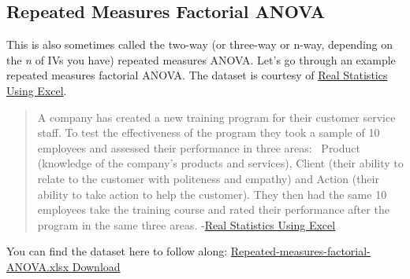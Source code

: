 \documentclass[
]{book}
\begin{document}
\hypertarget{repeated-measures-factorial-anova}{%
\subsection{Repeated Measures Factorial ANOVA}\label{repeated-measures-factorial-anova}}

This is also sometimes called the two-way (or three-way or n-way, depending on the \emph{n} of IVs you have) repeated measures ANOVA. Let's go through an example repeated measures factorial ANOVA. The dataset is courtesy of \href{https://www.real-statistics.com/anova-repeated-measures/two-within-subjects-factors/}{Real Statistics Using Excel}.

\begin{quote}
A company has created a new training program for their customer service staff. To test the effectiveness of the program they took a sample of 10 employees and assessed their performance in three areas: ~Product (knowledge of the company's products and services), Client (their ability to relate to the customer with politeness and empathy) and Action (their ability to take action to help the customer). They then had the same 10 employees take the training course and rated their performance after the program in the same three areas. -\href{A\%20company\%20has\%20created\%20a\%20new\%20training\%20program\%20for\%20their\%20customer\%20service\%20staff.\%20To\%20test\%20the\%20effectiveness\%20of\%20the\%20program\%20they\%20took\%20a\%20sample\%20of\%2010\%20employees\%20and\%20assessed\%20their\%20performance\%20in\%20three\%20areas:\%20Product\%20(knowledge\%20of\%20the\%20company’s\%20products\%20and\%20services),\%20Client\%20(their\%20ability\%20to\%20relate\%20to\%20the\%20customer\%20with\%20politeness\%20and\%20empathy)\%20and\%20Action\%20(their\%20ability\%20to\%20take\%20action\%20to\%20help\%20the\%20customer).\%20They\%20then\%20had\%20the\%20same\%2010\%20employees\%20take\%20the\%20training\%20course\%20and\%20rated\%20their\%20performance\%20after\%20the\%20program\%20in\%20the\%20same\%20three\%20areas.\%20Based\%20on\%20the\%20data\%20in\%20Figure\%201,\%20determine\%20whether\%20the\%20program\%20was\%20effective.}{Real Statistics Using Excel}
\end{quote}

You can find the dataset here to follow along: \href{https://github.com/danawanzer/stats-with-jamovi/blob/master/data/Repeated-measures-factorial-ANOVA.xlsx}{Repeated-measures-factorial-ANOVA.xlsx Download}
\end{document}
